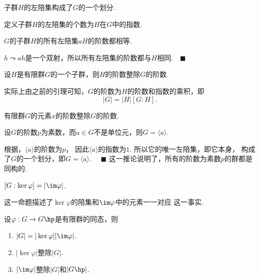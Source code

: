   \begin{cor}
    子群$H$的左陪集构成了$G$的一个划分.
  \end{cor}

  \begin{defi}
    定义子群$H$的左陪集的个数为$H$在$G$中的指数.
  \end{defi}

  \begin{lemma}[左陪集与阶]
    $G$的子群$H$的所有左陪集$aH$的阶数都相等.
  \end{lemma}
  \proof
    $h\leadsto ah$是一个双射，所以所有左陪集的阶数都与$H$相同.$\quad\blacksquare$

  \begin{thm}[Lagrange]
    设$H$是有限群$G$的一个子群，则$H$的阶数整除$G$的阶数.
  \end{thm}
  \remark
    实际上由之前的引理可知，$G$的阶数为$H$的阶数和指数的乘积，即
    \begin{equation}
      \label{equ: 阶、指数}
      |G| = |H|[G:H].
    \end{equation}

  \begin{cor}
    \label{cor: 元素与群的阶}
    有限群$G$的元素$x$的阶数整除$G$的阶数.
  \end{cor}

  \begin{cor}
    设$G$的阶数$p$为素数，而$a\in G$不是单位元，则$G=\langle a\rangle$.
  \end{cor}
  \proof
    根据，$\langle a \rangle$的阶数为$p$，
    因此$\langle a\rangle$的指数为$1$. 所以它的唯一左陪集，即它本身，
    构成了$G$的一个划分，即$G=\langle a\rangle$. $\quad\blacksquare$
  \remark
    这一推论说明了，所有的阶数为素数$p$的群都是同构的.

  \begin{pos}
    $[G:\ker\varphi] = |\im\varphi|$.
  \end{pos}
  \remark
    这一命题描述了$\ker\varphi$的陪集和$\im\varphi$中的元素一一对应
    这一事实.

  \begin{cor}
    设$\varphi: G\to G\hp$是有限群的同态，则
    \begin{enumerate}
      \item $|G|=|\ker\varphi||\im\varphi|$.
      \item $|\ker\varphi|$整除$|G|$.
      \item $|\im\varphi|$整除$|G|$和$|G\hp|$.
    \end{enumerate}
  \end{cor}

